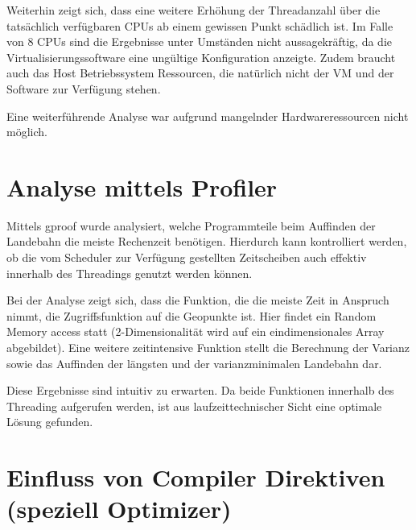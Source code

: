 \documentclass[10pt,a4paper]{report}
\begin{document}
Weiterhin zeigt sich, dass eine weitere Erhöhung der Threadanzahl über die tatsächlich verfügbaren CPUs ab einem gewissen Punkt schädlich ist.
Im Falle von 8 CPUs sind die Ergebnisse unter Umständen nicht aussagekräftig, da die Virtualisierungssoftware eine ungültige Konfiguration anzeigte. Zudem braucht auch das Host Betriebssystem Ressourcen, die natürlich nicht der VM und der Software zur Verfügung stehen.

  
Eine weiterführende Analyse war aufgrund mangelnder Hardwareressourcen nicht möglich.


\section{Analyse mittels Profiler}

Mittels gproof wurde analysiert, welche Programmteile beim Auffinden der Landebahn die meiste Rechenzeit benötigen. Hierdurch kann kontrolliert werden, ob die vom Scheduler zur Verfügung gestellten Zeitscheiben auch effektiv innerhalb des Threadings genutzt werden können. 

Bei der Analyse zeigt sich, dass die Funktion, die die meiste Zeit in Anspruch nimmt, die Zugriffsfunktion auf die Geopunkte ist. Hier findet ein Random Memory access statt (2-Dimensionalität wird auf ein eindimensionales Array abgebildet).
Eine weitere zeitintensive Funktion stellt die Berechnung der Varianz sowie das Auffinden der längsten und der varianzminimalen Landebahn dar.

Diese Ergebnisse sind intuitiv zu erwarten.
Da beide Funktionen innerhalb des Threading aufgerufen werden, ist aus laufzeittechnischer Sicht eine optimale Lösung gefunden. 

\section{Einfluss von Compiler Direktiven (speziell Optimizer)}
\end{document}

